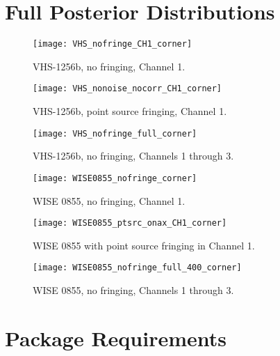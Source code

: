 \section{Full Posterior Distributions}\label{app:post}
\begin{figure}[h]
	\centering
	\texttt{[image: VHS\_nofringe\_CH1\_corner]}
	\caption{VHS-1256b, no fringing, Channel 1.}
\end{figure}
\begin{figure}[h]
	\centering
	\texttt{[image: VHS\_nonoise\_nocorr\_CH1\_corner]}
	\caption{VHS-1256b, point source fringing, Channel 1.}
\end{figure}
\begin{figure}[h]
	\centering
	\texttt{[image: VHS\_nofringe\_full\_corner]}
	\caption{VHS-1256b, no fringing, Channels 1 through 3.}
\end{figure}
\begin{figure}[h]
	\centering
	\texttt{[image: WISE0855\_nofringe\_corner]}
	\caption{WISE 0855, no fringing, Channel 1.}
\end{figure}
\begin{figure}[h]
	\centering
	\texttt{[image: WISE0855\_ptsrc\_onax\_CH1\_corner]}
	\caption{WISE 0855 with point source fringing in Channel 1.}
\end{figure}
\begin{figure}[h]
	\centering
	\texttt{[image: WISE0855\_nofringe\_full\_400\_corner]}
	\caption{WISE 0855, no fringing, Channels 1 through 3.}
\end{figure}
\clearpage
\section{Package Requirements}

